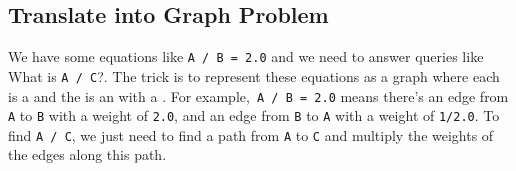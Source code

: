 \subsection*{Translate into Graph Problem}
We have some equations like {\colorbox{CodeBackground}{\lstinline|A / B = 2.0|}} and we need to answer queries like What is {\colorbox{CodeBackground}{\lstinline|A / C|}}?. The trick is to represent these equations as a graph where each {\color{blue}{variable}} is a {\color{blue}{node}} and the {\color{blue}{division}} is an {\color{blue}{edge}} with a {\color{blue}{weight}}. For example,{\colorbox{CodeBackground}{\lstinline| A / B = 2.0|}} means there's an edge from {\colorbox{CodeBackground}{\lstinline|A|}} to {\colorbox{CodeBackground}{\lstinline|B|}} with a weight of {\colorbox{CodeBackground}{\lstinline|2.0|}}, and an edge from {\colorbox{CodeBackground}{\lstinline|B|}} to {\colorbox{CodeBackground}{\lstinline|A|}} with a weight of {\colorbox{CodeBackground}{\lstinline|1/2.0|}}. To find {\colorbox{CodeBackground}{\lstinline|A / C|}}, we just need to find a path from {\colorbox{CodeBackground}{\lstinline|A|}} to {\colorbox{CodeBackground}{\lstinline|C|}} and multiply the weights of the edges along this path.

